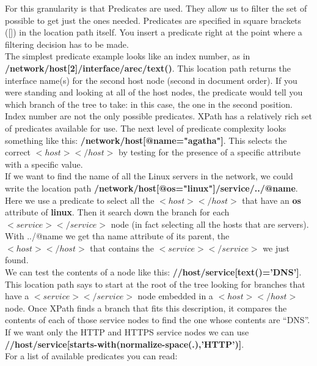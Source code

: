 For this granularity is that Predicates are used. They allow us to filter the set of possible to get just the ones needed. Predicates are specified in square brackets ([]) in the location path itself. You insert a predicate right at the point where a filtering decision has to be made.\\

The simplest predicate example looks like an index number, as in \textbf{/network/host[2]/interface/arec/text()}. This location path returns the interface name(s) for the second host node (second in document order). If you were standing and looking at all of the host nodes, the predicate would tell you which branch of the tree to take: in this case, the one in the second position.\\

Index number are not the only possible predicates. XPath has a relatively rich set of predicates available for use. The next level of predicate complexity looks something like this: \textbf{/network/host[@name="agatha"]}. This selects the correct $<host></host>$ by testing for the presence of a specific attribute with a specific value.\\

If we want to find the name of all the Linux servers in the network, we could write the location path \textbf{/network/host[@os="linux"]/service/../@name}. Here we use a predicate to select all the $<host></host>$ that have an \textbf{os} attribute of \textbf{linux}. Then it search down the branch for each $<service></service>$ node (in fact selecting all the hosts that are servers). With ../@name we get tha name attribute of its parent, the $<host></host>$ that contains the $<service></service>$ we just found. \cite{Blank-Edelm}\\

We can test the contents of a node like this: \textbf{//host/service[text()='DNS']}. This location path says to start at the root of the tree looking for branches that have a $<service></service>$ node embedded in a $<host></host>$ node. Once XPath finds a branch that fits this description, it compares the contents of each of those service nodes to find the one whose contents are “DNS”.\\

If we want only the HTTP and HTTPS service nodes we can use \textbf{//host/service[starts-with(normalize-space(.),'HTTP')]}.\\

For a list of available predicates you can read:\\

